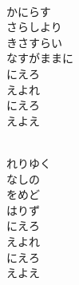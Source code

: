 \documentclass[10pt,b5j]{tarticle} %
\begin{document}
\vspace{1.5em} %
\newcommand{\linespace}{0.5em} %
\newcommand{\blocksize}{0.5\hsize} %
\newcommand{\itemmargin}{3em} %
\begin{enumerate} %
    \setlength{\itemindent}{\itemmargin} %
    \begin{minipage}[c]{\blocksize}
    
        \vspace{\linespace}
        \item~\\
        かにらす\\
        さらしより\\
        きさすらい\\
        なすがままに\\
        にえろ\\
        えよれ\\
        にえろ\\
        えよえ
        
    \end{minipage}
    \begin{minipage}[c]{\blocksize}
        
        \vspace{\linespace}
        \item~\\
        れりゆく\\
        なしの\\
        をめど\\
        はりず\\
        にえろ\\
        えよれ\\
        にえろ\\
        えよえ
        
    \end{minipage}
    \begin{minipage}[c]{\blocksize}
        

\end{minipage}
\end{enumerate}
\end{document}

